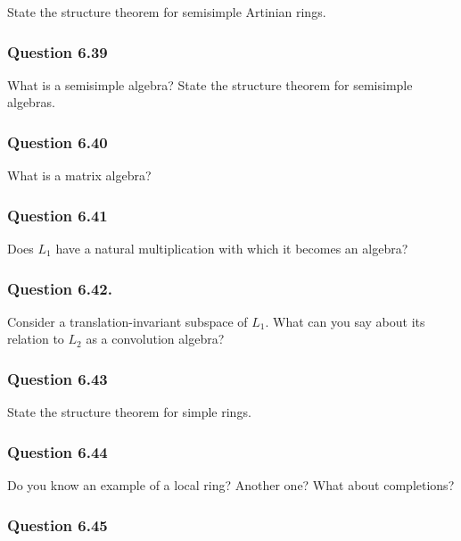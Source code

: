 State the structure theorem for semisimple Artinian rings.

\hypertarget{question-6.39}{%
\subsubsection{Question 6.39}\label{question-6.39}}

What is a semisimple algebra? State the structure theorem for semisimple
algebras.

\hypertarget{question-6.40}{%
\subsubsection{Question 6.40}\label{question-6.40}}

What is a matrix algebra?

\hypertarget{question-6.41}{%
\subsubsection{Question 6.41}\label{question-6.41}}

Does \(L_1\) have a natural multiplication with which it becomes an
algebra?

\hypertarget{question-6.42.}{%
\subsubsection{Question 6.42.}\label{question-6.42.}}

Consider a translation-invariant subspace of \(L_1\). What can you say
about its relation to \(L_2\) as a convolution algebra?

\hypertarget{question-6.43}{%
\subsubsection{Question 6.43}\label{question-6.43}}

State the structure theorem for simple rings.

\hypertarget{question-6.44}{%
\subsubsection{Question 6.44}\label{question-6.44}}

Do you know an example of a local ring? Another one? What about
completions?

\hypertarget{question-6.45}{%
\subsubsection{Question 6.45}\label{question-6.45}}

